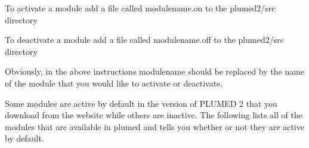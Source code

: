 \begin{DoxyItemize}
\item To activate a module add a file called modulename.\+on to the plumed2/src directory
\item To deactivate a module add a file called modulename.\+off to the plumed2/src directory
\end{DoxyItemize}

Obviously, in the above instructions modulename should be replaced by the name of the module that you would like to activate or deactivate.

Some modules are active by default in the version of P\+L\+U\+M\+E\+D 2 that you download from the website while others are inactive. The following lists all of the modules that are available in plumed and tells you whether or not they are active by default.

